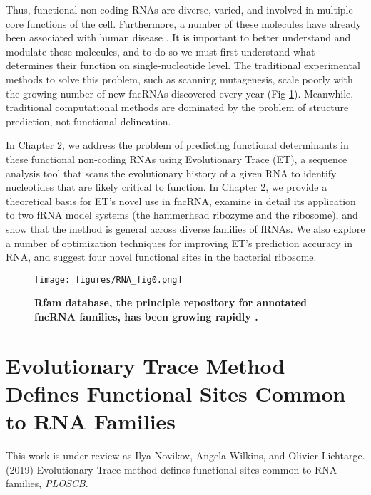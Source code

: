 \documentclass[12pt,a4paper]{report}
\begin{document}
Thus, functional non-coding RNAs are diverse, varied, and involved in multiple core functions of the cell. Furthermore, a number of these molecules have already been associated with human disease \cite{pmid25821444, Vulliamy2001, Taft2010, Gutschner2013}. It is important to better understand and modulate these molecules, and to do so we must first understand what determines their function on single-nucleotide level. The traditional experimental methods to solve this problem, such as scanning mutagenesis, scale poorly with the growing number of new fncRNAs discovered every year (Fig \ref{fig:rfam_grow}). Meanwhile, traditional computational methods are dominated by the problem of structure prediction, not functional delineation.

In Chapter 2, we address the problem of predicting functional determinants in these functional non-coding RNAs using Evolutionary Trace (ET), a sequence analysis tool that scans the evolutionary history of a given RNA to identify nucleotides that are likely critical to function. In Chapter 2, we provide a theoretical basis for ET's novel use in fncRNA, examine in detail its application to two fRNA model systems (the hammerhead ribozyme and the ribosome), and show that the method is general across diverse families of fRNAs. We also explore a number of optimization techniques for improving ET's prediction accuracy in RNA, and suggest four novel functional sites in the bacterial ribosome.

\begin{figure}
\begin{minipage}[c][\textheight]{\textwidth}
\centering
 \vspace{-5in}
  \texttt{[image: figures/RNA\_fig0.png]}
  \caption[Growth of the Rfam database.]{\textbf{Rfam database, the principle repository for annotated fncRNA families, has been growing rapidly \cite{Kalvari2018}.}}
  \label{fig:rfam_grow}
\end{minipage}
\end{figure}

\chapter[Evolutionary Trace Method Defines Functional Sites Common to RNA Families]{\LARGE Evolutionary Trace Method Defines Functional Sites Common to RNA Families}

This work is under review as Ilya Novikov, Angela Wilkins, and Olivier Lichtarge. (2019) Evolutionary Trace method defines functional sites common to RNA families, \textit{PLOSCB}.
\end{document}
